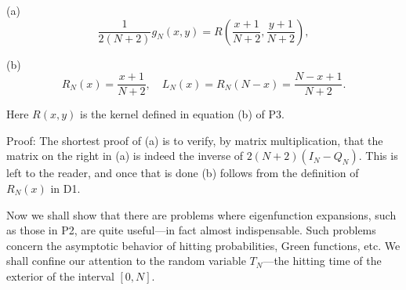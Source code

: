 (a) $$\frac{1}{2(N+2)} g_N(x,y) = R\left(\frac{x+1}{N+2}, \frac{y+1}{N+2}\right),$$

(b) $$R_N(x) = \frac{x+1}{N+2}, \quad L_N(x) = R_N(N-x) = \frac{N-x+1}{N+2}.$$

Here $R(x,y)$ is the kernel defined in equation (b) of P3.

Proof: The shortest proof of (a) is to verify, by matrix multiplication, that the matrix on the right in (a) is indeed the inverse of $2(N+2)(I_N - Q_N)$. This is left to the reader, and once that is done (b) follows from the definition of $R_N(x)$ in D1.

Now we shall show that there are problems where eigenfunction expansions, such as those in P2, are quite useful—in fact almost indispensable. Such problems concern the asymptotic behavior of hitting probabilities, Green functions, etc. We shall confine our attention to the random variable $T_N$—the hitting time of the exterior of the interval $[0,N]$.